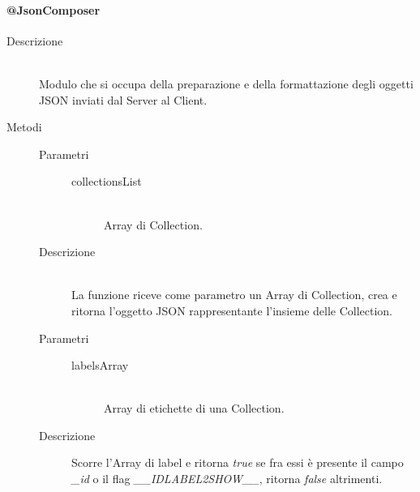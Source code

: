 \paragraph{@JsonComposer}
\begin{description}
 \item[Descrizione] \hfill \\
 Modulo che si occupa della preparazione e della formattazione degli oggetti JSON inviati dal Server al Client.
 
 \item[Metodi]
 \begin{mldescription}
   \hfill
   \begin{description}
    \item[Parametri] \hfill
     \begin{description}
      \item[collectionsList] \hfill \\
      Array di Collection.
     \end{description}
    \item[Descrizione] \hfill \\
    La funzione riceve come parametro un Array di Collection, crea e ritorna l'oggetto JSON rappresentante l'insieme delle Collection.
   \end{description}
  
   \hfill
   \begin{description}
    \item[Parametri]
     \begin{description}
      \item[labelsArray] \hfill \\
      Array di etichette di una Collection.
     \end{description}
    \item[Descrizione]
    Scorre l'Array di label e ritorna \textit{true} se fra essi è presente il campo \textit{\_id} o il flag \textit{\_\_IDLABEL2SHOW\_\_}, ritorna \textit{false} altrimenti.
   \end{description}
   

\end{mldescription}
\end{description}

